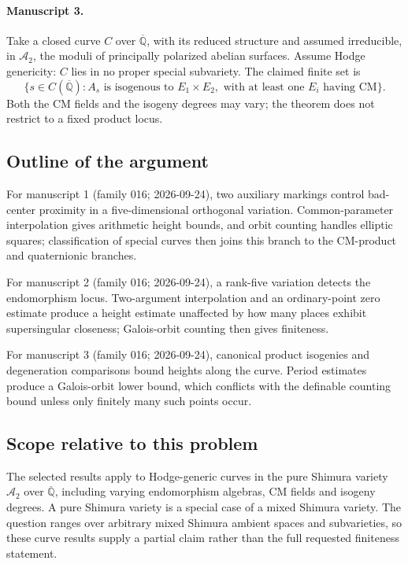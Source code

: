 \documentclass[11pt]{article}
\begin{document}
\paragraph{Manuscript 3.}
Take a closed curve $C$ over $\overline{\mathbb Q}$, with its reduced structure and assumed irreducible, in $\mathcal A_2$, the moduli of principally polarized abelian surfaces. Assume Hodge genericity: $C$ lies in no proper special subvariety. The claimed finite set is
\[
 \{s\in C(\overline{\mathbb Q}):A_s\text{ is isogenous to }E_1\times E_2,
 \text{ with at least one }E_i\text{ having CM}\}.
\]
Both the CM fields and the isogeny degrees may vary; the theorem does not restrict to a fixed product locus.

\subsection{Outline of the argument}
For manuscript 1 (family 016; 2026-09-24), two auxiliary markings control bad-center proximity in a five-dimensional orthogonal variation. Common-parameter interpolation gives arithmetic height bounds, and orbit counting handles elliptic squares; classification of special curves then joins this branch to the CM-product and quaternionic branches.

For manuscript 2 (family 016; 2026-09-24), a rank-five variation detects the endomorphism locus. Two-argument interpolation and an ordinary-point zero estimate produce a height estimate unaffected by how many places exhibit supersingular closeness; Galois-orbit counting then gives finiteness.

For manuscript 3 (family 016; 2026-09-24), canonical product isogenies and degeneration comparisons bound heights along the curve. Period estimates produce a Galois-orbit lower bound, which conflicts with the definable counting bound unless only finitely many such points occur.

\subsection{Scope relative to this problem}
The selected results apply to Hodge-generic curves in the pure Shimura variety $\mathcal A_2$ over $\overline{\mathbb Q}$, including varying endomorphism algebras, CM fields and isogeny degrees. A pure Shimura variety is a special case of a mixed Shimura variety. The question ranges over arbitrary mixed Shimura ambient spaces and subvarieties, so these curve results supply a partial claim rather than the full requested finiteness statement.
\end{document}
